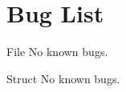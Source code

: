\chapter{Bug List}
\hypertarget{bug}{}\label{bug}

\begin{DoxyRefList}
\item[File \doxylink{csma_8cpp}{csma.cpp} ]\label{bug__bug000001}%
%
No known bugs.  
\item[Struct \doxylink{struct_node}{Node} ]\label{bug__bug000002}%
%
No known bugs. 
\end{DoxyRefList}